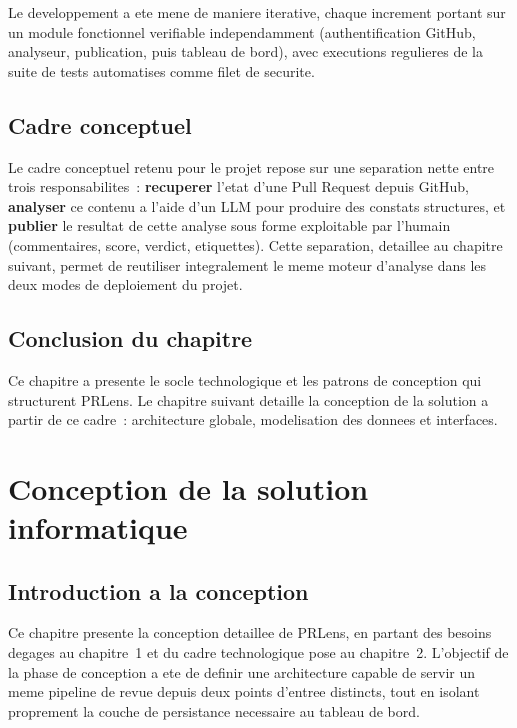 \documentclass[a4paper,12pt,oneside]{report}
\begin{document}
Le developpement a ete mene de maniere iterative, chaque increment portant sur un module fonctionnel verifiable independamment (authentification GitHub, analyseur, publication, puis tableau de bord), avec executions regulieres de la suite de tests automatises comme filet de securite.

\section{Cadre conceptuel}

Le cadre conceptuel retenu pour le projet repose sur une separation nette entre trois responsabilites~: \textbf{recuperer} l'etat d'une Pull Request depuis GitHub, \textbf{analyser} ce contenu a l'aide d'un LLM pour produire des constats structures, et \textbf{publier} le resultat de cette analyse sous forme exploitable par l'humain (commentaires, score, verdict, etiquettes). Cette separation, detaillee au chapitre suivant, permet de reutiliser integralement le meme moteur d'analyse dans les deux modes de deploiement du projet.

\section*{Conclusion du chapitre}

Ce chapitre a presente le socle technologique et les patrons de conception qui structurent PRLens. Le chapitre suivant detaille la conception de la solution a partir de ce cadre~: architecture globale, modelisation des donnees et interfaces.

\chapter{Conception de la solution informatique}

\section{Introduction a la conception}

Ce chapitre presente la conception detaillee de PRLens, en partant des besoins degages au chapitre~1 et du cadre technologique pose au chapitre~2. L'objectif de la phase de conception a ete de definir une architecture capable de servir un meme pipeline de revue depuis deux points d'entree distincts, tout en isolant proprement la couche de persistance necessaire au tableau de bord.
\end{document}
